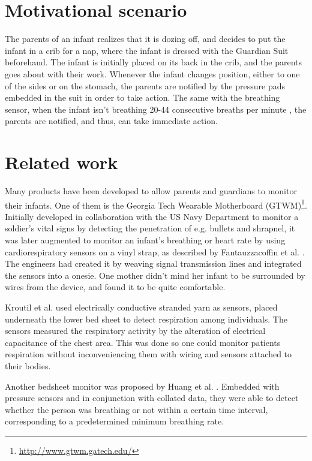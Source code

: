 \documentclass{sigchi-ext}
\begin{document}
\section{Motivational scenario}
The parents of an infant realizes that it is dozing off, and decides to put the infant in a crib for a nap, where the infant is dressed with the Guardian Suit beforehand. The infant is initially placed on its back in the crib, and the parents goes about with their work. Whenever the infant changes position, either to one of the sides or on the stomach, the parents are notified by the pressure pads embedded in the suit in order to take action. The same with the breathing sensor, when the infant isn't breathing 20-44 consecutive breaths per minute \cite{a18-huang}, the parents are notified, and thus, can take immediate action.

\section{Related work}
Many products have been developed to allow parents and guardians to monitor their infants. One of them is the Georgia Tech Wearable Motherboard (GTWM)\footnote{\url{http://www.gtwm.gatech.edu/}}. Initially developed in collaboration with the US Navy Department to monitor a soldier's vital signs by detecting the penetration of e.g. bullets and shrapnel, it was later augmented to monitor an infant's breathing or heart rate by using cardiorespiratory sensors on a vinyl strap, as described by Fantauzzacoffin et al. \cite{p285-fantauzzacoffin}. The engineers had created it by weaving signal transmission lines and integrated the sensors into a onesie. One mother didn't mind her infant to be surrounded by wires from the device, and found it to be quite comfortable.

Kroutil et al. \cite{a33-kroutil} used electrically conductive stranded yarn as sensors, placed underneath the lower bed sheet to detect respiration among individuals. The sensors measured the respiratory activity by the alteration of electrical capacitance of the chest area. This was done so one could monitor patients respiration without inconveniencing them with wiring and sensors attached to their bodies.

Another bedsheet monitor was proposed by Huang et al. \cite{a18-huang}. Embedded with pressure sensors and in conjunction with collated data, they were able to detect whether the person was breathing or not within a certain time interval, corresponding to a predetermined minimum breathing rate.
\end{document}
